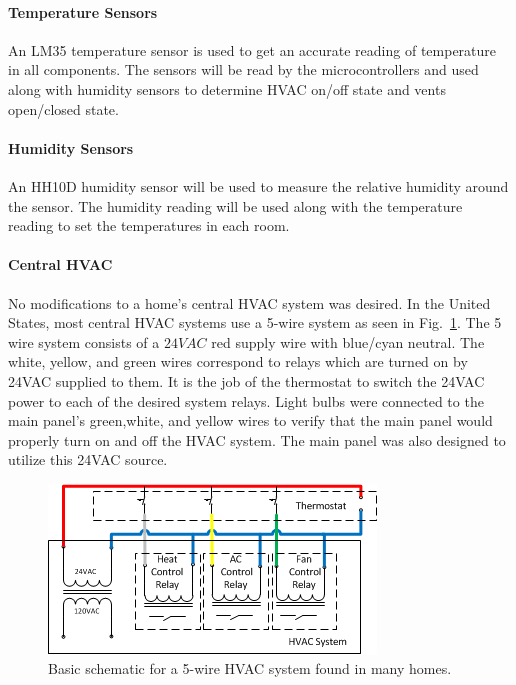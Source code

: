 \paragraph{Temperature Sensors}
\label{Temp Sensors}
An LM35 temperature sensor is used to get an accurate reading of temperature in all components. The sensors will be read by the microcontrollers and used along with humidity sensors to determine HVAC on/off state and vents open/closed state.
\paragraph{Humidity Sensors}
\label{humid_sensors}
An HH10D humidity sensor will be used to measure the relative humidity around the sensor.  The humidity reading will be used along with the temperature reading to set the temperatures in each room.

\paragraph{Central HVAC}
No modifications to a home's central HVAC system was desired. In the United States, most central HVAC systems use a 5-wire system as seen in Fig.~\ref{fig:5wire}.  The 5 wire system consists of a $24VAC$ red supply wire with blue/cyan neutral.  The white, yellow, and green wires correspond to relays which are turned on by 24VAC supplied to them. It is the job of the thermostat to switch the 24VAC power to each of the desired system relays.  Light bulbs were connected to the main panel's green,white, and yellow wires to verify that the main panel would properly turn on and off the HVAC system.  The main panel was also designed to utilize this 24VAC source.

\begin{figure}[htbp]
\centering
\includegraphics[width=.99\textwidth]{5wire.png}
\caption{Basic schematic for a 5-wire HVAC system found in many homes.}
\label{fig:5wire}
\end{figure}

